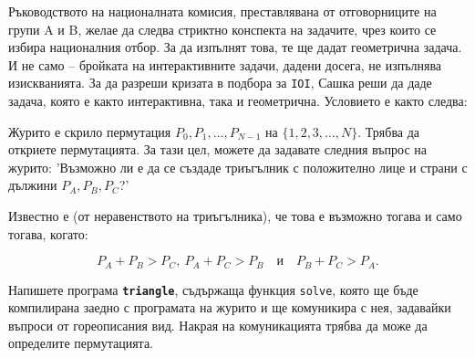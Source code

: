\documentclass[12pt]{article}
\begin{document}
\renewcommand{\headerLang}{Български}
\renewcommand{\problemName}{AB23. Триъгълник}

\renewcommand{\headerLeft}{IATI Ден 2, Старша група}
\renewcommand{\headerRightFirst}{XVII INTERNATIONAL ADVANCED TOURNAMENT IN INFORMATICS}
\renewcommand{\headerRightSecond}{ПРИСЪСТВЕНО 2026}

\renewcommand{\tl}{$10$ сек.}
\renewcommand{\ml}{$1024$ МБ}
\problem{Задача \problemName}

Ръководството на националната комисия, преставлявана от отговорниците на групи A и B, желае да следва стриктно конспекта на задачите, чрез които се избира националния отбор. За да изпълнят това, те ще дадат геометрична задача. И не само -- бройката на интерактивните задачи, дадени досега, не изпълнява изискванията. За да разреши кризата в подбора за \texttt{IOI}, Сашка реши да даде задача, която е както интерактивна, така и геометрична. Условието е както следва: 

Журито е скрило пермутация $P_0, P_1, \dots, P_{N-1}$ на $\{1, 2, 3, \dots, N\}$. Трябва да откриете пермутацията. За тази цел, можете да задавате следния въпрос на журито: 'Възможно ли е да се създаде триъгълник с положително лице и страни с дължини $P_A, P_B, P_C$?'
 
Известно е (от неравенството на триъгълника), че това е възможно тогава и само тогава, когато:

\[P_A + P_B > P_C,\ P_A + P_C > P_B \quad \text{и} \quad P_B + P_C > P_A.\]

Напишете програма \textbf{\texttt{triangle}}, съдържаща функция \texttt{solve}, която ще бъде компилирана заедно с програмата на журито и ще комуникира с нея, задавайки въпроси от гореописания вид. Накрая на комуникацията трябва да може да определите пермутацията.
\end{document}

